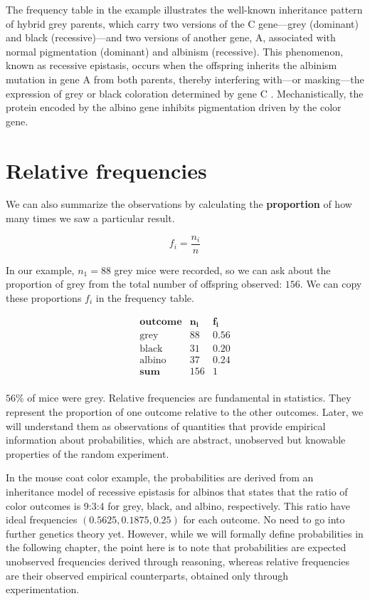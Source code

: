 \documentclass[
]{book}
\begin{document}
The frequency table in the example illustrates the well-known inheritance pattern of hybrid grey parents, which carry two versions of the C gene---grey (dominant) and black (recessive)---and two versions of another gene, A, associated with normal pigmentation (dominant) and albinism (recessive). This phenomenon, known as recessive epistasis, occurs when the offspring inherits the albinism mutation in gene A from both parents, thereby interfering with---or masking---the expression of grey or black coloration determined by gene C \citep{little1914possible}. Mechanistically, the protein encoded by the albino gene inhibits pigmentation driven by the color gene.

\hypertarget{relative-frequencies}{%
\section{Relative frequencies}\label{relative-frequencies}}

We can also summarize the observations by calculating the \textbf{proportion} of how many times we saw a particular result.

\[f_i = \frac{n_i}{n}\]

In our example, \(n_1=88\) grey mice were recorded, so we can ask about the proportion of grey from the total number of offspring observed: \(156\). We can copy these proportions \(f_i\) in the frequency table.

\[
\begin{array}{ccc}
\mathbf{outcome} & \mathbf{n_i} & \mathbf{f_i} \\
\text{grey}  & 88    & 0.56  \\
\text{black}   & 31     & 0.20  \\ 
\text{albino}  & 37     & 0.24 \\ \hline
\mathbf{sum} & 156 & 1 \\
\end{array}
\]

\(56\%\) of mice were grey. Relative frequencies are fundamental in statistics. They represent the proportion of one outcome relative to the other outcomes. Later, we will understand them as observations of quantities that provide empirical information about probabilities, which are abstract, unobserved but knowable properties of the random experiment.

In the mouse coat color example, the probabilities are derived from an inheritance model of recessive epistasis for albinos that states that the ratio of color outcomes is 9:3:4 for grey, black, and albino, respectively. This ratio have ideal frequencies \((0.5625, 0.1875, 0.25)\) for each outcome. No need to go into further genetics theory yet. However, while we will formally define probabilities in the following chapter, the point here is to note that probabilities are expected unobserved frequencies derived through reasoning, whereas relative frequencies are their observed empirical counterparts, obtained only through experimentation.
\end{document}
